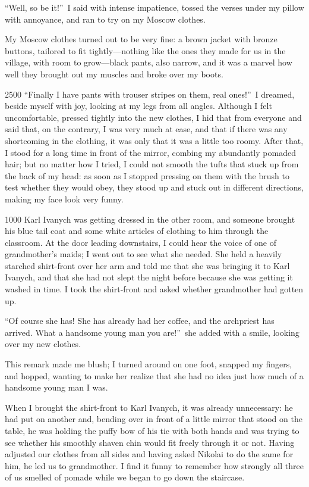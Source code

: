 ``Well, so be it!''~I said with intense impatience, tossed the verses under my pillow with annoyance, and ran to try on my Moscow clothes. %

My Moscow clothes turned out to be very fine: a brown jacket with bronze buttons, tailored to fit tightly---nothing like the ones they made for us in the village, with room to grow---black pants, also narrow, and it was a marvel how well they brought out my muscles and broke over my boots.

\begin{tolerant}{2500}
``Finally I have pants with trouser stripes on them, real ones!''~I dreamed, beside myself with joy, looking at my legs from all angles. Although I felt uncomfortable, pressed tightly into the new clothes, I hid that from everyone and said that, on the contrary, I was very much at ease, and that if there was any shortcoming in the clothing, it was only that it was a little too roomy. After that, I stood for a long time in front of the mirror, combing my abundantly pomaded hair; but no matter how I tried, I could not smooth the tufts that stuck up from the back of my head: as soon as I stopped pressing on them with the brush to test whether they would obey, they stood up and stuck out in different directions, making my face look very funny.
\end{tolerant}

\begin{tolerant}{1000}
Karl Ivanych was getting dressed in the other room, and someone brought his blue tail coat and some white articles of clothing to him through the classroom. At the door leading downstairs, I could hear the voice of one of grandmother's maids; I went out to see what she needed. She held a heavily starched shirt-front over her arm and told me that she was bringing it to Karl Ivanych, and that she had not slept the night before because she was getting it washed in time. I took the shirt-front and asked whether grandmother had gotten up.
\end{tolerant}

``Of course she has! She has already had her coffee, and the archpriest has arrived. What a handsome young man you are!''~she added with a smile, looking over my new clothes. %

This remark made me blush; I turned around on one foot, snapped my fingers, and hopped, wanting to make her realize that she had no idea just how much of a handsome young man I was.

When I brought the shirt-front to Karl Ivanych, it was already unnecessary: he had put on another and, bending over in front of a little mirror that stood on the table, he was holding the puffy bow of his tie with both hands and was trying to see whether his smoothly shaven chin would fit freely through it or not. Having adjusted our clothes from all sides and having asked Nikolai to do the same for him, he led us to grandmother. I find it funny to remember how strongly all three of us smelled of pomade while we began to go down the staircase.

